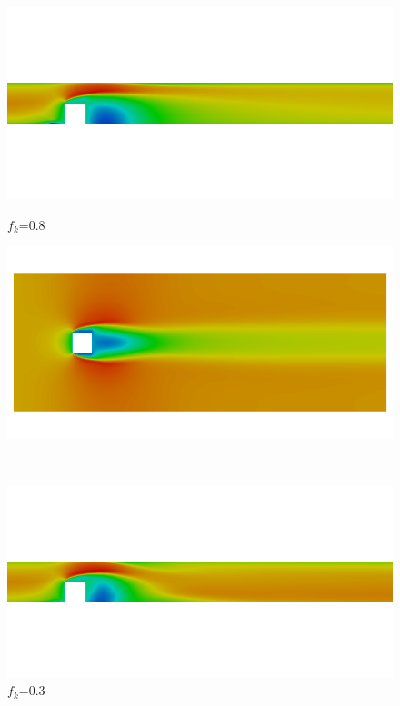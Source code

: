 \begin{figure}[H]
\begin{minipage}[b]{0.5\linewidth}
\includegraphics[scale=0.25]{figure/fine/eight/Umean_z.png}
\caption*{$f_k$=0.8}
\end{minipage}
\begin{minipage}[b]{0.5\linewidth}
\includegraphics[scale=0.25]{figure/fine/eight/Umean_y.png}
\caption*{}
\end{minipage}\\
\begin{minipage}[b]{0.5\linewidth}
\includegraphics[scale=0.25]{figure/fine/three/Umean_z.png}
\caption*{$f_k$=0.3}

\end{minipage}
\end{figure}
